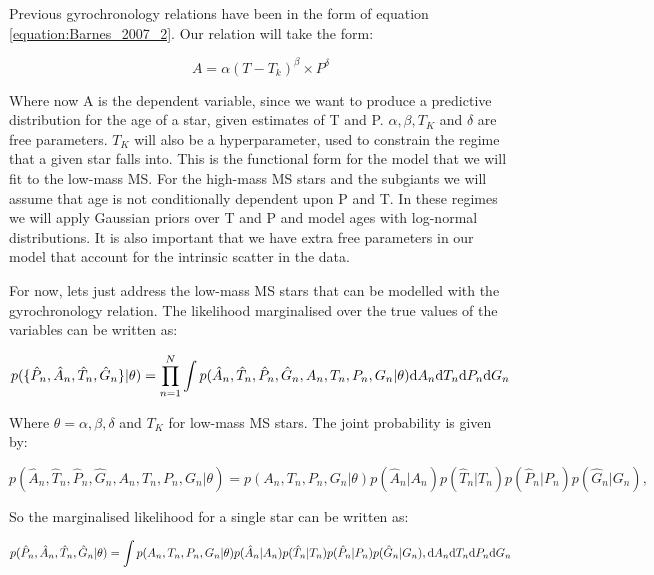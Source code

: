 \documentclass[12pt,preprint]{aastex}
\begin{document}
Previous gyrochronology relations have been in the form of equation \ref{equation:Barnes_2007_2}.
Our relation will take the form:

\begin{equation}
	A = \alpha(T - T_k)^{\beta} \times P^{\delta}
\label{eq:functional_form2}
\end{equation}

Where now A is the dependent variable, since we want to produce a predictive distribution for the age of a star, given estimates of T and P.
$\alpha, \beta, T_K$ and $\delta$ are free parameters.
$T_K$ will also be a hyperparameter, used to constrain the regime that a given star falls into.
This is the functional form for the model that we will fit to the low-mass MS.
For the high-mass MS stars and the subgiants we will assume that age is not conditionally dependent upon P and T.
In these regimes we will apply Gaussian priors over T and P and model ages with log-normal distributions.
It is also important that we have extra free parameters in our model that account for the intrinsic scatter in the data.

For now, lets just address the low-mass MS stars that can be modelled with the gyrochronology relation.
The likelihood marginalised over the true values of the variables can be written as:

\begin{equation}
  p(\{\hat{P}_n,\hat{A}_n,\hat{T}_n,\hat{G}_n\}|\theta) =
  \prod_{n=1}^{N} \int p(\hat{A}_n,\hat{T}_n,\hat{P}_n,\hat{G}_n,A_n,T_n,P_n,G_n|\theta)
  {\rm d}A_n {\rm d}T_n {\rm d}P_n {\rm d}G_n
\label{eq:fullL}
\end{equation}

Where $\theta = \alpha, \beta, \delta$ and $T_K$ for low-mass MS stars. The joint probability is given by:

\begin{equation}
  p(\hat{A}_n,\hat{T}_n,\hat{P}_n,\hat{G}_n,A_n,T_n,P_n,G_n|\theta) =
  p(A_n,T_n,P_n,G_n|\theta) p(\hat{A}_n|A_n)
  p(\hat{T}_n|T_n) p(\hat{P}_n|P_n) p(\hat{G}_n|G_n),
\label{eq:jointprob}
\end{equation}

So the marginalised likelihood for a single star can be written as:

\begin{equation}
  p(\hat{P}_n,\hat{A}_n,\hat{T}_n,\hat{G}_n|\theta)  =
  \int p(A_n,T_n,P_n,G_n|\theta)
  p(\hat{A}_n|A_n) p(\hat{T}_n|T_n) p(\hat{P}_n|P_n) p(\hat{G}_n|G_n),
  {\rm d}A_n {\rm d}T_n {\rm d}P_n {\rm d}G_n
\label{eq:L1}
\end{equation}
\end{document}
